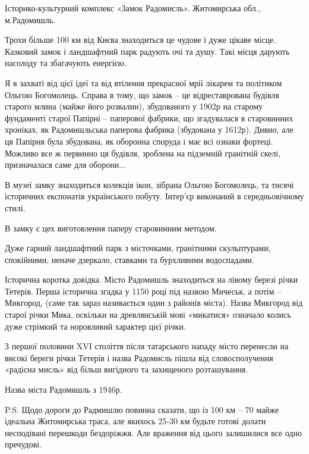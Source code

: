 Історико-культурний комплекс «Замок Радомисль». Житомирська обл., м.Радомишль.

Трохи більше 100 км від Києва знаходиться це чудове і дуже цікаве місце.
Казковий замок і ландшафтний парк радують очі та душу. Такі місця дарують
насолоду та збагачують енергією.


Я в захваті від цієї ідеї та від втілення прекрасної мрії лікарем та політиком
Ольгою Богомолець. Справа в тому, що замок – це відреставрована будівля старого
млина (майже його розвалин), збудованого у 1902р на старому фундаменті старої
Папірні – паперової фабрики, що згадувалася в старовинних хроніках, як
Радомишльська паперова фабрика (збудована у 1612р). Дивно, але ця Папірня була
збудована, як оборонна споруда і має всі ознаки фортеці. Можливо все ж первинно
ця будівля, зроблена на підземній гранітній скелі, призначалася саме для
оборони...


В музеї замку знаходиться колекція ікон, зібрана Ольгою Богомолець, та тисячі
історичних експонатів українського побуту. Інтер’єр виконаний в середньовічному
стилі. 

В замку є цех виготовлення паперу старовинним методом.


Дуже гарний ландшафтний парк з місточками, гранітними скульптурами, спокійними,
неначе дзеркало, ставками та бурхливими водоспадами.


Історична коротка довідка. Місто Радомишль знаходиться на лівому березі річки
Тетерів. Перша історична згадка у 1150 році під назвою Мичеськ, а потім –
Микгород, (саме так зараз називається один з районів міста). Назва Микгород від
старої річки Мика, оскільки на древлянській мові «микатися» означало колись
дуже стрімкий та норовливий характер цієї річки. 

З першої половини XVI століття після татарського нападу місто перенесли на
високі береги річки Тетерів і назва Радомисль пішла від словосполучення
«радісна мисль» від більш вигідного та захищеного розташування.

Назва міста Радомишль з 1946р.

P.S. Щодо дороги до Радмишлю повинна сказати, що із 100 км – 70 майже ідеальна
Житомирська траса, але якихось 25-30 км будьте готові долати несподівані
перешкоди бездоріжжя. Але враження від цього залишилися все одно пречудові.
